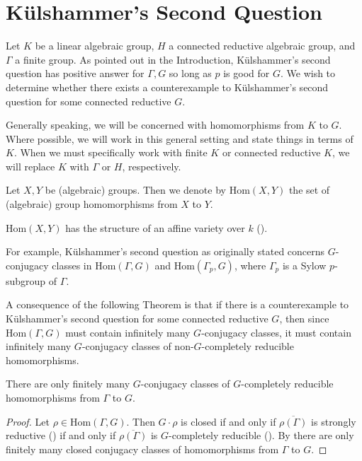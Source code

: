 
\chapter{K\"ulshammer's Second Question}
\label{Chapter4}

Let $K$ be a linear algebraic group, $H$ a connected reductive algebraic group, and $\Gamma$ a finite group.
As pointed out in the Introduction, K\"ulshammer's second question has positive answer for $\Gamma, G$ so long as $p$ is good for $G$. We wish to determine whether there exists a counterexample to K\"ulshammer's second question for some connected reductive $G$.

Generally speaking, we will be concerned with homomorphisms from $K$ to $G$. Where possible, we will work in this general setting and state things in terms of $K$. When we must specifically work with finite $K$ or connected reductive $K$, we will replace $K$ with $\Gamma$ or $H$, respectively.
\begin{definition} Let $X,Y$ be (algebraic) groups. Then we denote by $\mathrm{Hom}(X, Y)$ the set of (algebraic) group homomorphisms from $X$ to $Y$.
\end{definition}
\begin{remark}
	$\mathrm{Hom}(X, Y)$ has the structure of an affine variety over $k$ (\cite[Section 3]{martin2000restrictions}).
\end{remark}

For example, K\"ulshammer's second question as originally stated concerns $G$-conjugacy classes in $\mathrm{Hom}(\Gamma, G)$ and $\mathrm{Hom}(\Gamma_p, G)$, where $\Gamma_p$ is a Sylow $p$-subgroup of $\Gamma$.

A consequence of the following Theorem  is that if there is a counterexample to K\"ulshammer's second question for some connected reductive $G$, then since $\mathrm{Hom}(\Gamma, G)$ must contain infinitely many $G$-conjugacy classes, it must contain infinitely many $G$-conjugacy classes of non-$G$-completely reducible homomorphisms.

\begin{theorem} \label{thm:finiteGCR} There are only finitely many $G$-conjugacy classes of $G$-completely reducible homomorphisms from $\Gamma$ to $G$.
\end{theorem}
\begin{proof}
Let $\rho\in \mathrm{Hom}(\Gamma, G)$. Then $G\cdot \rho$ is closed if and only if $\overline{\rho(\Gamma)}$ is strongly reductive (\cite[Proposition 2.16]{bate2005geometric}) if and only if $\overline{\rho(\Gamma)}$ is $G$-completely reducible (\cite[Theorem 3.1]{bate2005geometric}). By \cite[Theorem 1.2]{martin2003reductive} there are only finitely many closed conjugacy classes of homomorphisms from $\Gamma$ to $G$.
\end{proof}

